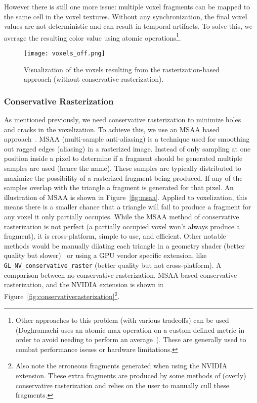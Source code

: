 However there is still one more issue: multiple voxel fragments can be mapped to the same cell in the voxel textures. Without any synchronization, the final voxel values are not deterministic and can result in temporal artifacts. To solve this, we average the resulting color value using atomic operations\footnote{Other approaches to this problem (with various tradeoffs) can be used (Doghramachi uses an atomic max operation on a custom defined metric in order to avoid needing to perform an average~\cite{doghramachi2013rasterized}). These are generally used to combat performance issues or hardware limitations.}.

\begin{figure}[h]
\centering
    \texttt{[image: voxels\_off.png]}
    \caption{Visualization of the voxels resulting from the rasterization-based approach (without conservative rasterization).}
    \label{fig:voxels_off}
\end{figure}

\subsubsection{Conservative Rasterization}
As mentioned previously, we need conservative rasterization to minimize holes and cracks in the voxelization. To achieve this, we use an MSAA based approach~\cite{takeshige2015basics}. MSAA (multi-sample anti-aliasing) is a technique used for smoothing out ragged edges (aliasing) in a rasterized image. Instead of only sampling at one position inside a pixel to determine if a fragment should be generated multiple samples are used (hence the name). These samples are typically distributed to maximize the possibility of a rasterized fragment being produced. If any of the samples overlap with the triangle a fragment is generated for that pixel. An illustration of MSAA is shown in Figure~\ref{fig:msaa}. Applied to voxelization, this means there is a smaller chance that a triangle will fail to produce a fragment for any voxel it only partially occupies. While the MSAA method of conservative rasterization is not perfect (a partially occupied voxel won't always produce a fragment), it is cross-platform, simple to use, and efficient. Other notable methods would be manually dilating each triangle in a geometry shader (better quality but slower)~\cite{akenine2005conservative} or using a GPU vendor specific extension, like \verb#GL_NV_conservative_raster# (better quality but not cross-platform). A comparison between no conservative rasterization, MSAA-based conservative rasterization, and the NVIDIA extension is shown in Figure~\ref{fig:conservativerasterization}\footnote{Also note the erroneous fragments generated when using the NVIDIA extension. These extra fragments are produced by some methods of (overly) conservative rasterization and relies on the user to manually cull these fragments.}.

